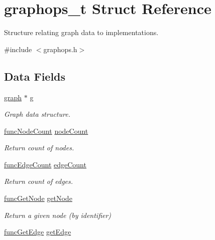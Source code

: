 \hypertarget{structgraphops__t}{}\section{graphops\+\_\+t Struct Reference}
\label{structgraphops__t}


Structure relating graph data to implementations.  




{\ttfamily \#include $<$graphops.\+h$>$}

\subsection*{Data Fields}
\begin{DoxyCompactItemize}
\item 
\hyperlink{graphdata_8h_ad149912e738dca1c84b3b4508382fff5}{graph} $\ast$ \hyperlink{structgraphops__t_ab8a78cf4f0bdfe6a65aa217a716ca537}{g}
\begin{DoxyCompactList}\small\item\em Graph data structure. \end{DoxyCompactList}\item 
\hyperlink{graphops_8h_a5f1ba03cba8efec39224db7b6afc8374}{func\+Node\+Count} \hyperlink{structgraphops__t_a07801b43de87d48f426d7abf7959e738}{node\+Count}
\begin{DoxyCompactList}\small\item\em Return count of nodes. \end{DoxyCompactList}\item 
\hyperlink{graphops_8h_a9c7f99c0f38ebae08cb49e70ffe91fa1}{func\+Edge\+Count} \hyperlink{structgraphops__t_a5db6e2eee59ada7705fb54bf5f6b9ee1}{edge\+Count}
\begin{DoxyCompactList}\small\item\em Return count of edges. \end{DoxyCompactList}\item 
\hyperlink{graphops_8h_ab5b794bee2b91f62033011c8e4c867ec}{func\+Get\+Node} \hyperlink{structgraphops__t_ab410442ef123fc79f1c8a431502e2a23}{get\+Node}
\begin{DoxyCompactList}\small\item\em Return a given node (by identifier) \end{DoxyCompactList}\item 
\hyperlink{graphops_8h_aed109d4861cfae4ea7721603770befca}{func\+Get\+Edge} \hyperlink{structgraphops__t_aafbe3ec7bdce040b86d7748c953cf607}{get\+Edge}

\end{DoxyCompactItemize}
